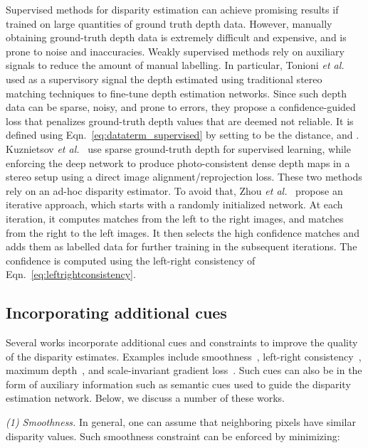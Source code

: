 \documentclass[10pt,journal,compsoc]{IEEEtran}
\newcommand{\etal}{\emph{et al.}}
\newcommand{\noi}{\noindent}
\begin{document}
Supervised methods for disparity estimation can achieve promising results if trained on large quantities of ground truth depth data. However, manually obtaining ground-truth depth data is  extremely difficult and expensive, and is prone to noise and inaccuracies. Weakly supervised methods rely on auxiliary signals to reduce the amount of manual labelling. In particular, Tonioni \etal \cite{tonioni2017unsupervised} used as a supervisory signal the depth estimated using traditional stereo matching techniques to fine-tune depth estimation networks. Since such depth data can be sparse, noisy, and prone to errors, they propose a confidence-guided loss that penalizes ground-truth depth values that are deemed not reliable.  It is defined using Eqn.~\eqref{eq:dataterm_supervised} by setting  to be the  distance, and   . Kuznietsov \etal~\cite{kuznietsov2017semi} use  sparse ground-truth depth for supervised learning, while enforcing the deep network to produce photo-consistent dense depth maps in a stereo setup using a direct image alignment/reprojection loss.   These two methods rely on an ad-hoc disparity estimator. To avoid that, Zhou \etal~\cite{zhou2017unsupervisedlearing} propose an iterative approach, which starts with a randomly initialized network.  At each iteration,  it computes matches from the left  to the right images, and matches from the right  to the left images. It then selects the   high confidence matches and adds them as labelled data for further training in the subsequent iterations. The confidence is computed using the left-right consistency of Eqn.~\eqref{eq:leftrightconsistency}. 

\subsection{Incorporating additional cues} 
\label{sec:additional_cues}
Several works  incorporate additional cues and constraints to improve the quality of the disparity estimates. Examples include  smoothness~\cite{zhong2017self}, left-right consistency~\cite{zhong2017self},  maximum depth~\cite{zhong2017self}, and scale-invariant gradient loss~\cite{ummenhofer2017demon}. Such cues can also be in the form of auxiliary information such as semantic cues used to guide the disparity estimation network. Below, we discuss a number  of these works.

\vspace{6pt}
\noi\textit{(1) Smoothness. } In general, one can assume that neighboring pixels have similar disparity values. Such smoothness constraint can be enforced by minimizing:
\end{document}
